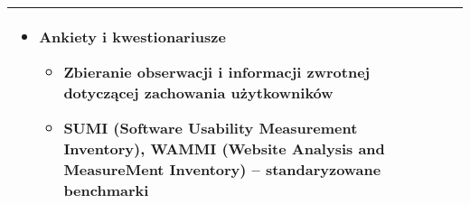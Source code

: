 \documentclass[../main.tex]{subfiles}
\begin{document}
\begin{table}[H]
\begin{center}
\begin{tabular}{| p{8cm} | p{8cm} |}
\begin{itemize}
                    \item \textbf{Ankiety i kwestionariusze}
                    \begin{itemize}
                        \item Zbieranie \textbf{obserwacji} i \textbf{informacji zwrotnej} dotyczącej zachowania użytkowników
                        \item \textbf{SUMI} (Software Usability Measurement Inventory), \textbf{WAMMI} (Website Analysis and MeasureMent Inventory)
                        – standaryzowane benchmarki
                    \end{itemize}
                \end{itemize} \\
                \hline
            \end{tabular}
        \end{center}
    \end{table}
\end{document}
